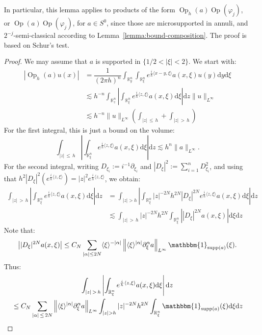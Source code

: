 \documentclass[10pt]{amsart}
\theoremstyle{definition}\newtheorem{defi}[theo]{Definition}\newtheorem{rema}[theo]{Remark}\newtheorem{exam}[theo]{Example}\newtheorem{exem}[theo]{Example}\newtheorem{nota}[theo]{Notation}
\newcommand{\R}{\mathbb{R}}
\newcommand{\dd}{\mathrm{d}}
\newcommand{\supp}{\mathrm{supp}}
\DeclareMathOperator{\Op}{Op}
\begin{document}
In particular, this lemma applies to products of the form $\Op_h(a)\Op(\varphi_j)$, or $\Op(a) \Op(\varphi_j)$, for $a\in S^0$, since those are microsupported in annuli, and $2^{-j}$-semi-classical according to Lemma~\ref{lemma:bound-composition}. The proof is based on Schur's test.

\begin{proof}
We may assume that $a$ is supported in $\{ 1/2 < |\xi|<2 \}$. We start with:
\begin{align*}
\left|\Op_h(a) u(x)\right| & = \dfrac{1}{(2\pi h)^n} \int_{\R^n_y} \int_{\R^n_\xi} e^{\frac{i}{h}\langle x-y, \xi \rangle} a(x,\xi) u(y) \dd y \dd \xi \\
& \lesssim h^{-n} \int_{\R^n_z} \left| \int_{\R^n_\xi} e^{\frac{i}{h}\langle z, \xi \rangle} a(x,\xi) \dd \xi \right| \dd z \|u\|_{L^\infty} \\
&\lesssim h^{-n} \|u\|_{L^\infty} \left(\int_{|z|\,\leq\,h} + \int_{|z|\,>\,h} \right)
\end{align*}
For the first integral, this is just a bound on the volume:
\[
\int_{|z|\,\leq\,h} \left| \int_{\R^n_\xi} e^{\frac{i}{h}\langle z, \xi \rangle} a(x,\xi) \dd \xi \right| \dd z \lesssim h^n \|a\|_{L^\infty}.
\]
For the second integral, writing $D_{\xi_i} := i^{-1} \partial_{\xi_i}$ and $|D_\xi|^2 := \sum_{i=1}^n D_{\xi_i}^2$, and using that $h^2|D_\xi|^2(e^{\frac{i}{h} \langle z, \xi \rangle}) = |z|^2 e^{\frac{i}{h} \langle z, \xi \rangle}$, we obtain:
\[
\begin{split}
\int_{|z|\,>\,h} \left| \int_{\R^n_\xi} e^{\frac{i}{h}\langle z, \xi \rangle} a(x,\xi) \dd \xi \right| \dd z &= \int_{|z| > h } \left| \int_{\R^n_\xi} |z|^{-2N} h^{2N} |D_\xi|^{2N}e^{\frac{i}{h}\langle z, \xi \rangle} a(x,\xi) \dd \xi \right| \dd z\\
&\lesssim \int_{|z|\,>\,h} |z|^{-2N} h^{2N} \int_{\R^n_\xi} \left||D_\xi|^{2N} a(x,\xi)\right| \dd \xi\dd z
\end{split}
\]
Note that:
\[
\left||D_\xi|^{2N}a (x,\xi)\right| \leq C_N \sum_{|\alpha| \leq 2N} \langle \xi \rangle^{-|\alpha|} \left\|\langle \xi \rangle^{|\alpha|} \partial^\alpha_\xi a\right\|_{L^\infty} \mathbbm{1}_{\supp(a)}(\xi).
\]
Thus:
\begin{multline*}
\int_{|z|\,>\,h} \left| \int_{\R^n_\xi} e^{\frac{i}{h}\langle z, \xi \rangle} a(x,\xi) \dd \xi \right| \dd z 
\\
\begin{aligned}
& \leq C_N \sum_{|\alpha|\,\leq \,2N} \left\|\langle \xi \rangle^{|\alpha|} \partial^\alpha_\xi a\right\|_{L^\infty} \int_{|z| > h } |z|^{-2N} h^{2N} \int_{\R^n_\xi} \mathbbm{1}_{\supp(a)}(\xi)\dd \xi\dd z\\

\end{aligned}
\end{multline*}
\end{proof}
\end{document}
